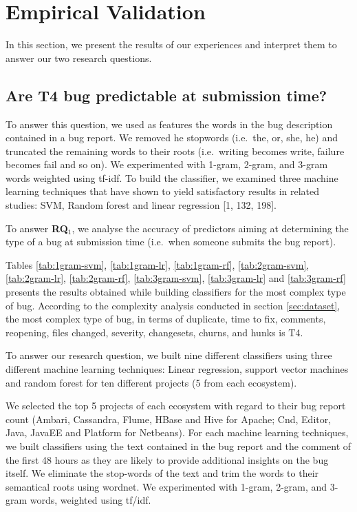 \documentclass[12pt]{report}
\begin{document}
\section{Empirical Validation}\label{empirical-validation-4}

In this section, we present the results of our experiences and interpret
them to answer our two research questions.

\subsection{Are T4 bug predictable at submission
time?}\label{are-t4-bug-predictable-at-submission-time}

To answer this question, we used as features the words in the bug
description contained in a bug report. We removed he stopwords
(i.e.~the, or, she, he) and truncated the remaining words to their roots
(i.e.~writing becomes write, failure becomes fail and so on). We
experimented with 1-gram, 2-gram, and 3-gram words weighted using
tf-idf. To build the classifier, we examined three machine learning
techniques that have shown to yield satisfactory results in related
studies: SVM, Random forest and linear regression {[}1, 132, 198{]}.

To answer \textbf{RQ\(_1\)}, we analyse the accuracy of predictors
aiming at determining the type of a bug at submission time (i.e.~when
someone submits the bug report).

Tables \ref{tab:1gram-svm}, \ref{tab:1gram-lr}, \ref{tab:1gram-rf},
\ref{tab:2gram-svm}, \ref{tab:2gram-lr}, \ref{tab:2gram-rf},
\ref{tab:3gram-svm}, \ref{tab:3gram-lr} and \ref{tab:3gram-rf} presents
the results obtained while building classifiers for the most complex
type of bug. According to the complexity analysis conducted in section
\ref{sec:dataset}, the most complex type of bug, in terms of duplicate,
time to fix, comments, reopening, files changed, severity, changesets,
churns, and hunks is T4.

To answer our research question, we built nine different classifiers
using three different machine learning techniques: Linear regression,
support vector machines and random forest for ten different projects (5
from each ecosystem).

We selected the top 5 projects of each ecosystem with regard to their
bug report count (Ambari, Cassandra, Flume, HBase and Hive for Apache;
Cnd, Editor, Java, JavaEE and Platform for Netbeans). For each machine
learning techniques, we built classifiers using the text contained in
the bug report and the comment of the first 48 hours as they are likely
to provide additional insights on the bug itself. We eliminate the
stop-words of the text and trim the words to their semantical roots
using wordnet. We experimented with 1-gram, 2-gram, and 3-gram words,
weighted using tf/idf.
\end{document}
